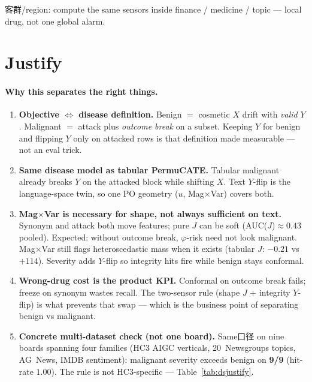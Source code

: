 \documentclass[11pt]{article}
\begin{document}
\noindent
客群/region: compute the same sensors inside finance / medicine / topic ---
local drug, not one global alarm.

\section{Justify}

\paragraph{Why this separates the right things.}
\begin{enumerate}[leftmargin=1.3em,itemsep=0.45em]
  \item \textbf{Objective $\Leftrightarrow$ disease definition.}
    Benign $=$ cosmetic $X$ drift with \emph{valid} $Y$.
    Malignant $=$ attack plus \emph{outcome break} on a subset.
    Keeping $Y$ for benign and flipping $Y$ only on attacked rows is that
    definition made measurable --- not an eval trick.
  \item \textbf{Same disease model as tabular PermuCATE.}
    Tabular malignant already breaks $Y$ on the attacked block while shifting
    $X$. Text $Y$-flip is the language-space twin, so one PO geometry
    ($u$, Mag$\times$Var) covers both.
  \item \textbf{Mag$\times$Var is necessary for shape, not always sufficient on text.}
    Synonym and attack both move features; pure $J$ can be soft
    (AUC($J$)$\approx 0.43$ pooled). Expected: without outcome break,
    $\varphi$-risk need not look malignant. Mag$\times$Var still flags
    heteroscedastic mass when it exists (tabular $J$: $-0.21$ vs $+114$).
    Severity adds $Y$-flip so integrity hits fire while benign stays conformal.
  \item \textbf{Wrong-drug cost is the product KPI.}
    Conformal on outcome break fails; freeze on synonym wastes recall.
    The two-sensor rule (shape $J$ + integrity $Y$-flip) is what prevents
    that swap --- which is the business point of separating benign vs malignant.
  \item \textbf{Concrete multi-dataset check (not one board).}
    Same口径 on nine boards spanning four families
    (HC3 AIGC verticals, 20~Newsgroups topics, AG~News, IMDB sentiment):
    malignant severity exceeds benign on \textbf{9/9} (hit-rate $1.00$).
    The rule is not HC3-specific --- Table~\ref{tab:dsjustify}.
\end{enumerate}
\end{document}
